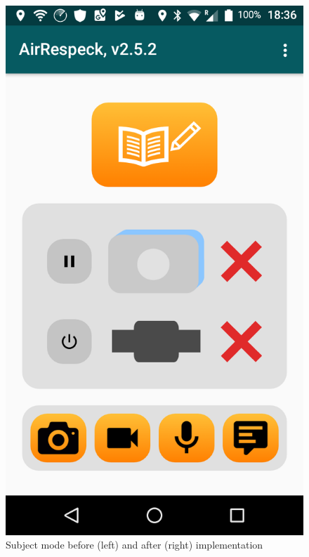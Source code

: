 \begin{figure}[H]
\begin{minipage}[b]{0.5\linewidth}
    \includegraphics[width=.8\linewidth]{images/main} 
    \vspace{3ex}
  \end{minipage} 
  \caption{Subject mode before (left) and after (right) implementation }
  \label{fig:main}
  \vspace{0.5cm}
  \begin{minipage}[b]{0.33\linewidth}
    \centering

\end{minipage}
\end{figure}
